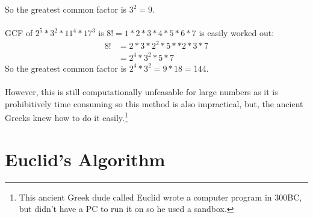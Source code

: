 So the greatest common factor is $3^2 = 9$.\\
\\
GCF of $2^5 * 3^2 * 11^4 * 17^3$ is $8! = 1*2*3*4*5*6*7$ is easily worked out:
\begin{align}
  8! & = 2* 3 * 2^2 * 5 * *2 * 3* 7 \\
     & = 2^4 * 3^2 * 5 * 7
\end{align}
So the greatest common factor is $2^4 * 3^2 = 9 * 18 = 144$.\\
\\
However, this is still computationally unfeasable for large numbers as it is
prohibitively time consuming so this method is also impractical, but, the
ancient Greeks knew how to do it easily.\footnote{This ancient Greek dude called
Euclid wrote a computer program in 300BC, but didn't have a PC to run it on so
he used a sandbox.}

\section{Euclid's Algorithm}
\label{sec:EuclidsAlgorithm}